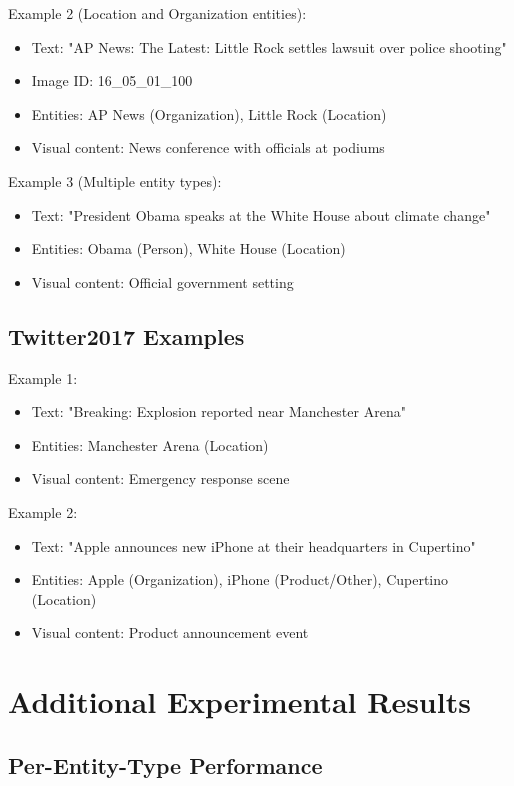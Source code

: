 \documentclass[12pt,a4paper]{report}
\begin{document}
Example 2 (Location and Organization entities):
\begin{itemize}
\item Text: "AP News: The Latest: Little Rock settles lawsuit over police shooting"
\item Image ID: 16\_05\_01\_100
\item Entities: AP News (Organization), Little Rock (Location)
\item Visual content: News conference with officials at podiums
\end{itemize}

Example 3 (Multiple entity types):
\begin{itemize}
\item Text: "President Obama speaks at the White House about climate change"
\item Entities: Obama (Person), White House (Location)
\item Visual content: Official government setting
\end{itemize}

\section{Twitter2017 Examples}

Example 1:
\begin{itemize}
\item Text: "Breaking: Explosion reported near Manchester Arena"
\item Entities: Manchester Arena (Location)
\item Visual content: Emergency response scene
\end{itemize}

Example 2:
\begin{itemize}
\item Text: "Apple announces new iPhone at their headquarters in Cupertino"
\item Entities: Apple (Organization), iPhone (Product/Other), Cupertino (Location)
\item Visual content: Product announcement event
\end{itemize}

\chapter{Additional Experimental Results}

\section{Per-Entity-Type Performance}
\end{document}
